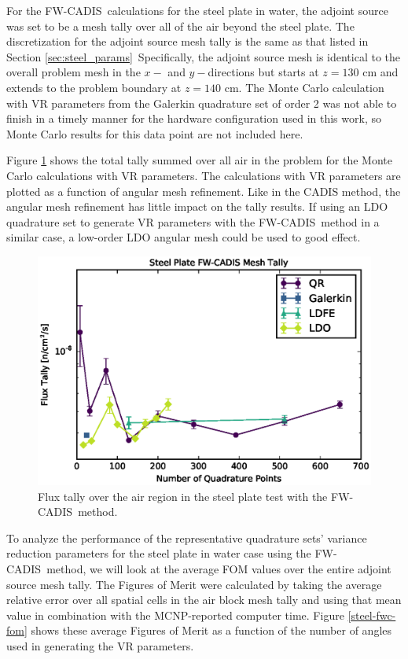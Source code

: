 \documentclass{article} %
\newcommand{\fwc}{\mbox{FW-CADIS}}
\begin{document}
For the \fwc\ calculations for the steel plate in water, the adjoint source
was set to be a mesh tally over all of the air beyond the steel plate. The
discretization for the adjoint source mesh tally is the same as that listed in
Section \ref{sec:steel_params}\ Specifically, the adjoint source mesh is
identical to the overall problem mesh in the $x-$ and $y-$directions but
starts at $z = 130$ cm and extends to the problem boundary at $z = 140$ cm.
The Monte Carlo calculation with VR parameters from the Galerkin
quadrature set of order 2 was not able to finish in a timely manner for the
hardware configuration used in this work, so Monte Carlo results for this data
point are not included here.

Figure \ref{steel-fwc-tally} shows the total tally summed over all air in the
problem for the Monte Carlo calculations with VR parameters. The calculations
with VR parameters are plotted as a function of angular mesh refinement. Like
in the CADIS method, the angular mesh refinement has little impact on the
tally results. If using an LDO quadrature set to generate VR parameters with
the \fwc\ method in a similar case, a low-order LDO angular mesh could be
used to good effect.

\begin{figure}[!htb]
\centering
\includegraphics[max height=0.445\textheight]{steel-fwcadis-tally.eps}
\caption{Flux tally over the air region in the steel plate test with the \fwc\ method.}
\label{steel-fwc-tally}
\end{figure}

To analyze the performance of the representative quadrature sets' variance
reduction parameters for the steel plate in water case using the \fwc\ method,
we will look at the average FOM values over the entire adjoint source mesh
tally. The Figures of Merit were calculated by taking the average relative
error over all spatial cells in the air block mesh tally and using that mean
value in combination with the MCNP-reported computer time. Figure 
\ref{steel-fwc-fom} shows these average Figures of Merit as a function of the
number of angles used in generating the VR parameters.
\end{document}
